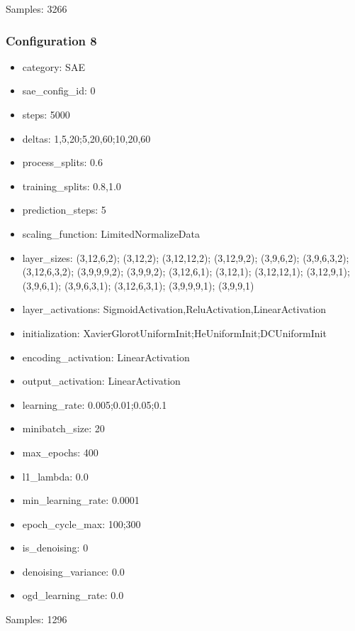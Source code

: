 \documentclass[a4paper,11pt,oneside]{article}
\theoremstyle{plain}
\theoremstyle{definition}
\begin{document}
Samples: 3266

\subsubsection{Configuration 8}\label{config8}
\begin{itemize}
	\item category: SAE
	\item sae\_config\_id: 0
	\item steps: 5000
	\item deltas: 1,5,20;5,20,60;10,20,60
	\item process\_splits: 0.6
	\item training\_splits: 0.8,1.0
	\item prediction\_steps: 5
	\item scaling\_function: LimitedNormalizeData
	\item layer\_sizes: (3,12,6,2); (3,12,2); (3,12,12,2); (3,12,9,2); (3,9,6,2); (3,9,6,3,2); (3,12,6,3,2); (3,9,9,9,2); (3,9,9,2); (3,12,6,1); (3,12,1); (3,12,12,1); (3,12,9,1); (3,9,6,1); (3,9,6,3,1); (3,12,6,3,1); (3,9,9,9,1); (3,9,9,1)
	\item layer\_activations: SigmoidActivation,ReluActivation,LinearActivation
	\item initialization: XavierGlorotUniformInit;HeUniformInit;DCUniformInit
	\item encoding\_activation: LinearActivation
	\item output\_activation: LinearActivation
	\item learning\_rate: 0.005;0.01;0.05;0.1
	\item minibatch\_size: 20
	\item max\_epochs: 400
	\item l1\_lambda: 0.0
	\item min\_learning\_rate: 0.0001
	\item epoch\_cycle\_max: 100;300
	\item is\_denoising: 0
	\item denoising\_variance: 0.0
	\item ogd\_learning\_rate: 0.0
\end{itemize}

Samples: 1296
\end{document}
